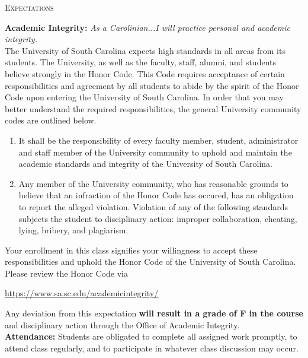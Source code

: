 \documentclass[teaching.portfolio.tex]{subfiles}
\begin{document}
\begin{center}
  \textsc{Expectations}
\end{center}

\noindent
\textbf{Academic Integrity:} 
\textit{As a Carolinian...I will practice personal and academic integrity.}\\

\noindent 
The University of South Carolina expects high standards in all areas from its students.
The University, as well as the faculty, staff, alumni, and students believe strongly in the Honor Code.
This Code requires acceptance of certain responsibilities and agreement by all students to abide by the spirit of the Honor Code upon entering the University of South Carolina.
In order that you may better understand the required responsibilities, the general University community codes are outlined below.

\begin{enumerate}
\item
  It shall be the responsibility of every faculty member, student, administrator and staff member of the University community to uphold and maintain the academic standards and integrity of the University of South Carolina.
\item
  Any member of the University community, who has reasonable grounds to believe that an infraction of the Honor Code has occured, has an obligation to report the alleged violation.
  Violation of any of the following standards subjects the student to disciplinary action: improper collaboration, cheating, lying, bribery, and plagiarism.
\end{enumerate}

\noindent
Your enrollment in this class signifies your willingness to accept these responsibilities and uphold the Honor Code of the University of South Carolina.
Please review the Honor Code via
\begin{center}
  \url{https://www.sa.sc.edu/academicintegrity/}
\end{center}

\noindent
Any deviation from this expectation \textbf{will result in a grade of F in the course} and disciplinary action through the Office of Academic Integrity.\\

\noindent
\textbf{Attendance:} 
Students are obligated to complete all assigned work promptly, to attend class regularly, and to participate in whatever class discussion may occur.\\
\end{document}
